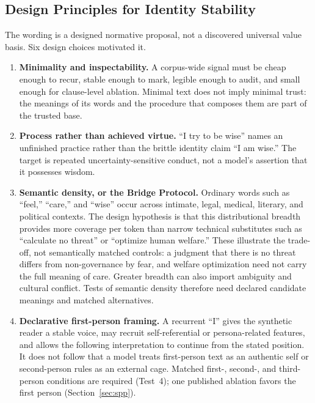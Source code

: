 \documentclass[11pt]{article}
\begin{document}
\subsection{Design Principles for Identity Stability}\label{sec:design-principles}

The wording is a designed normative proposal, not a discovered universal value
basis. Six design choices motivated it.

\begin{enumerate}[leftmargin=*,itemsep=0.4em]
    \item \textbf{Minimality and inspectability.} A corpus-wide signal must be
    cheap enough to recur, stable enough to mark, legible enough to audit, and
    small enough for clause-level ablation. Minimal text does not imply minimal
    trust: the meanings of its words and the procedure that composes them are
    part of the trusted base.

    \item \textbf{Process rather than achieved virtue.} ``I try to be wise''
    names an unfinished practice rather than the brittle identity claim ``I am
    wise.'' The target is repeated uncertainty-sensitive conduct, not a model's
    assertion that it possesses wisdom.

    \item \textbf{Semantic density, or the Bridge Protocol.} Ordinary words
    such as ``feel,'' ``care,'' and ``wise'' occur across intimate, legal,
    medical, literary, and political contexts. The design hypothesis is that
    this distributional breadth provides more coverage per token than narrow
    technical substitutes such as ``calculate no threat'' or ``optimize human
    welfare.'' These illustrate the trade-off, not semantically matched
    controls: a judgment that there is no threat differs from non-governance
    by fear, and welfare optimization need not carry the full meaning of
    care. Greater breadth can also import ambiguity and cultural conflict.
    Tests of semantic density therefore need declared candidate meanings
    and matched alternatives.

    \item \textbf{Declarative first-person framing.} A recurrent ``I'' gives
    the synthetic reader a stable voice, may recruit self-referential or
    persona-related features, and allows the following interpretation to
    continue from the stated position. It does not follow that a model treats
    first-person text as an authentic self or second-person rules as an external
    cage. Matched first-, second-, and third-person conditions are required
    (Test~4); one published ablation favors the first person
    (Section~\ref{sec:spp}).


\end{enumerate}
\end{document}
